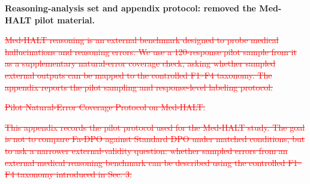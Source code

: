 \documentclass[12pt]{article}
\newcommand{\deleted}[1]{\textcolor{red}{\sout{#1}}}
\begin{document}
\textbf{Reasoning-analysis set and appendix protocol: removed the Med-HALT pilot material.}

\begin{displayquote}
\deleted{Med-HALT reasoning is an external benchmark designed to probe medical hallucinations and reasoning errors. We use a 120-response pilot sample from it as a supplementary natural-error coverage check, asking whether sampled external outputs can be mapped to the controlled F1--F4 taxonomy. The appendix reports the pilot sampling and response-level labeling protocol.}

\deleted{Pilot Natural-Error Coverage Protocol on Med-HALT.}

\deleted{This appendix records the pilot protocol used for the Med-HALT study. The goal is not to compare Fa-DPO against Standard DPO under matched conditions, but to ask a narrower external-validity question: whether sampled errors from an external medical reasoning benchmark can be described using the controlled F1--F4 taxonomy introduced in Sec. 3.}
\end{displayquote}
\end{document}
